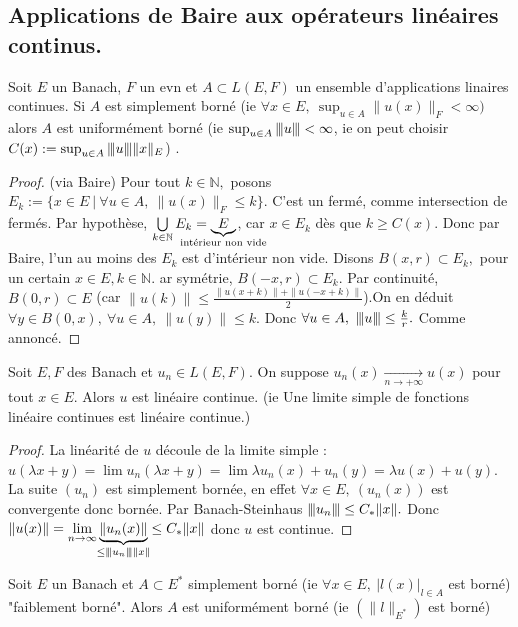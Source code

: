 \subsection{Applications de Baire aux opérateurs linéaires continus.}
\begin{theoreme}
    Soit $E$ un Banach, $F$ un evn et $A\subset L(E,F)$ un ensemble d'applications linaires continues. Si $A$ est simplement borné (ie $\forall x\in E,\ \sup_{u\in A}\|u(x)\|_F<\infty ) $ alors $A$ est uniformément borné (ie $\sup_{u\in A}{\left\vert\kern-0.25ex\left\vert\kern-0.25ex\left\vert u \right\vert\kern-0.25ex\right\vert\kern-0.25ex\right\vert}<\infty $, ie on peut choisir $C(x):=\sup_{u\in A}{\left\vert\kern-0.25ex\left\vert\kern-0.25ex\left\vert u \right\vert\kern-0.25ex\right\vert\kern-0.25ex\right\vert}\|x\|_E$) .
\end{theoreme}
\begin{proof}
    (via Baire) Pour tout $k\in \mathbb{N} ,$ posons $E_k:=\{x\in E\ |\ \forall u\in A,\ \|u(x)\|_F\le k \} $. C'est un fermé, comme intersection de fermés. Par hypothèse, $\bigcup\limits_{k\in \mathbb{N} } E_k=\underbrace{E}_{\mathclap{\text{intérieur non vide}}}$, car $x\in E_k$ dès que $k\ge C(x).$ Donc par Baire, l'un au moins des $E_k$ est d'intérieur non vide. Disons $B(x,r)\subset E_k,$ pour un certain $x\in E,k\in \mathbb{N} .$  ar symétrie, $B(-x,r)\subset E_k.$ Par continuité, $B(0,r)\subset E$ (car $\|u(k)\|\le \frac{\|u(x+k)\|+\|u(-x+k)\|}{2}$).On en déduit $\forall y\in B(0,x),\ \forall u\in A,\ \|u(y)\|\le k.  $ Donc $\forall u\in A,\ {\left\vert\kern-0.25ex\left\vert\kern-0.25ex\left\vert u \right\vert\kern-0.25ex\right\vert\kern-0.25ex\right\vert}\le \frac{k}{r}. $ Comme annoncé.
\end{proof}
\begin{corollaire}
    Soit $E,F$ des Banach et $u_n\in L(E,F).$ On suppose $u_n(x)\xrightarrow[n\to +\infty]{} u(x)$ pour tout $x\in E.$ Alors $u$ est linéaire continue. (ie Une limite simple de fonctions linéaire continues est linéaire continue.)
\end{corollaire}
\begin{proof}
    La linéarité de $u$ découle de la limite simple : $u(\lambda x+y)=\lim u_n(\lambda x+y)=\lim \lambda u_n(x)+u_n(y)=\lambda u(x)+u(y)$.\\
    La suite $(u_n)$ est simplement bornée, en effet $\forall x\in E,\ (u_n(x)) $ est convergente donc bornée. Par Banach-Steinhaus ${\left\vert\kern-0.25ex\left\vert\kern-0.25ex\left\vert u_n \right\vert\kern-0.25ex\right\vert\kern-0.25ex\right\vert}\le C_*\|x\|.$ Donc $\|u(x)\|=\lim_{n\to \infty }\underbrace{\|u_n(x)\|}_{\mathclap{\substack{\le \vertiii{u_n}\|x\|}}}\le C_*\|x\|$ donc $u$ est continue.
\end{proof}
\begin{corollaire}
    Soit $E$ un Banach et $A\subset E^*$ simplement borné (ie $\forall x\in E,\ |l(x)|_{l\in A} $ est borné) "faiblement borné". Alors $A$ est uniformément borné (ie $(\|l\|_{E^*})$ est borné)
\end{corollaire}

